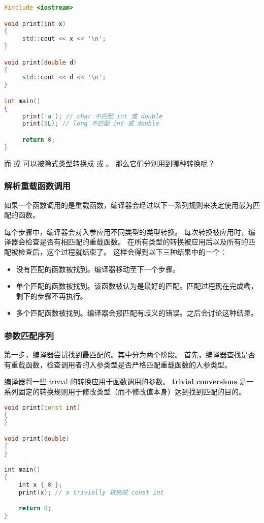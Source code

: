 \documentclass[../../LearnCpp.tex]{subfiles}
\begin{document}

\begin{lstlisting}[language=C++]
#include <iostream>

void print(int x)
{
     std::cout << x << '\n';
}

void print(double d)
{
     std::cout << d << '\n';
}

int main()
{
     print('a'); // char 不匹配 int 或 double
     print(5L); // long 不匹配 int 或 double

     return 0;
}
\end{lstlisting}

而  或  可以被隐式类型转换成  或 。
那么它们分别用到哪种转换呢？

\subsubsection*{解析重载函数调用}

如果一个函数调用的是重载函数，编译器会经过以下一系列规则来决定使用最为匹配的函数。

每个步骤中，编译器会对入参应用不同类型的类型转换。
每次转换被应用时，编译器会检查是否有相匹配的重载函数。
在所有类型的转换被应用后以及所有的匹配被检查后，这个过程就结束了。
这样会得到以下三种结果中的一个：

\begin{itemize}
  \item 没有匹配的函数被找到。编译器移动至下一个步骤。
  \item 单个匹配的函数被找到。该函数被认为是最好的匹配。匹配过程现在完成嘞，剩下的步骤不再执行。
  \item 多个匹配函数被找到。编译器会报匹配有歧义的错误。之后会讨论这种结果。
\end{itemize}

\subsubsection*{参数匹配序列}

第一步，编译器尝试找到最匹配的。其中分为两个阶段。
首先，编译器查找是否有重载函数，检查调用者的入参类型是否严格匹配重载函数的入参类型。

编译器将一些 trivial 的转换应用于函数调用的参数。
\textbf{trivial conversions} 是一系列固定的转换规则用于修改类型（而不修改值本身）达到找到匹配的目的。

\begin{lstlisting}[language=C++]
void print(const int)
{
}

void print(double)
{
}

int main()
{
    int x { 0 };
    print(x); // x trivially 转换成 const int

    return 0;
}
\end{lstlisting}
\end{document}
